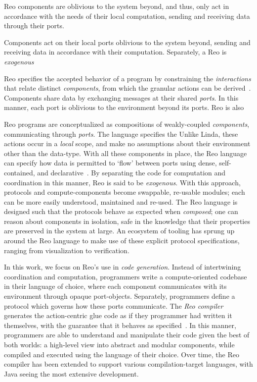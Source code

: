Reo components are oblivious to the system beyond, and thus, only act in accordance with the needs of their local computation, sending and receiving data through their ports. 


 Components act on their local ports oblivious to the system beyond, sending and receiving data in accordance with their computation. Separately, a 
Reo is \textit{exogenous}

Reo specifies the accepted behavior of a program by constraining the \textit{interactions} that relate distinct \textit{components}, from which the granular actions can be derived~\cite{arbab2011puff}. Components share data by exchanging messages at their shared \textit{ports}. In this manner, each port is oblivious to the environment beyond its ports. Reo is also 


Reo programs are conceptualized as compositions of weakly-coupled \textit{components}, communicating through \textit{ports}. The language specifies the 
Unlike Linda, these actions occur in a \textit{local} scope, and make no assumptions about their environment other than the data-type. With all these components in place, the Reo language can specify how data is permitted to `flow' between ports using dense, self-contained, and declarative~\cite{arbab2004reo}. By separating the code for computation and coordination in this manner, Reo is said to be \textit{exogenous}. With this approach, protocols and compute-components become swappable, re-usable modules; each can be more easily understood, maintained and re-used. The Reo language is designed such that the protocols behave as expected when \textit{composed}; one can reason about components in isolation, safe in the knowledge that their properties are preserved in the system at large. An ecosystem of tooling has sprung up around the Reo language to make use of these explicit protocol specifications, ranging from visualization to verification. 

In this work, we focus on Reo's use in \textit{code generation}. Instead of intertwining coordination and computation, programmers write a compute-oriented codebase in their language of choice, where each component communicates with its environment through opaque port-objects. Separately, programmers define a protocol which governs how these ports communicate. The \textit{Reo compiler} generates the action-centric glue code as if they programmer had written it themselves, with the guarantee that it behaves as specified~\cite{jongmans2013modularizing}. In this manner, programmers are able to understand and manipulate their code given the best of both worlds: a high-level view into abstract and modular components, while compiled and executed using the language of their choice. Over time, the Reo compiler has been extended to support various compilation-target languages, with Java seeing the most extensive development. 

